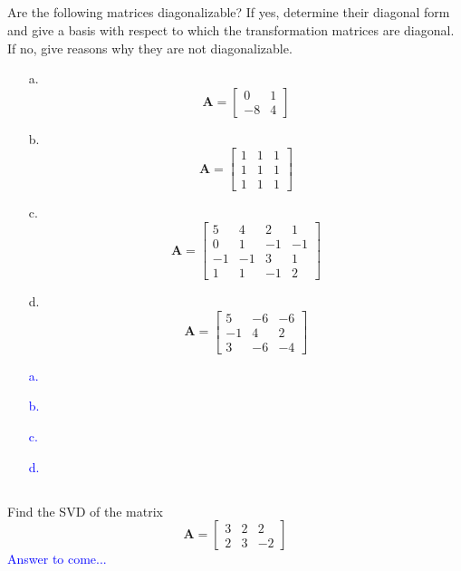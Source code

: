 \documentclass[a4paper,12pt]{article}
\newcommand{\M}[1]{ \begin{bmatrix} #1 \end{bmatrix} }
\newcommand{\matA}{\textbf{A}}
\begin{document}
\subsection{}
Are the following matrices diagonalizable? If yes, determine their diagonal form and give a basis with respect to which the transformation matrices are diagonal.
If no, give reasons why they are not diagonalizable.
\begin{itemize}
 \item [a.] $$\matA = \M{ 0&1\\
                                     -8&4}$$
 \item [b.] $$\matA = \M{1&1&1\\ 
                                     1&1&1\\
                                     1&1&1}$$
 \item [c.] $$\matA = \M{5&4&2&1\\
                                     0&1&-1&-1\\
                                    -1&-1&3&1\\
                                    1&1&-1&2}$$
 \item [d.] $$\matA = \M{5&-6&-6\\
                                    -1&4&2\\
                                    3&-6&-4}$$
\end{itemize}
\textcolor{blue}{
\begin{itemize}
 \item [a.] 
 \item [b.] 
 \item [c.] 
 \item [d.] 
\end{itemize}
}
\subsection{}
Find the SVD of the matrix 
$$\matA = \M{3&2&2\\2&3&-2}$$
\textcolor{blue}{
Answer to come...
}
\end{document}

